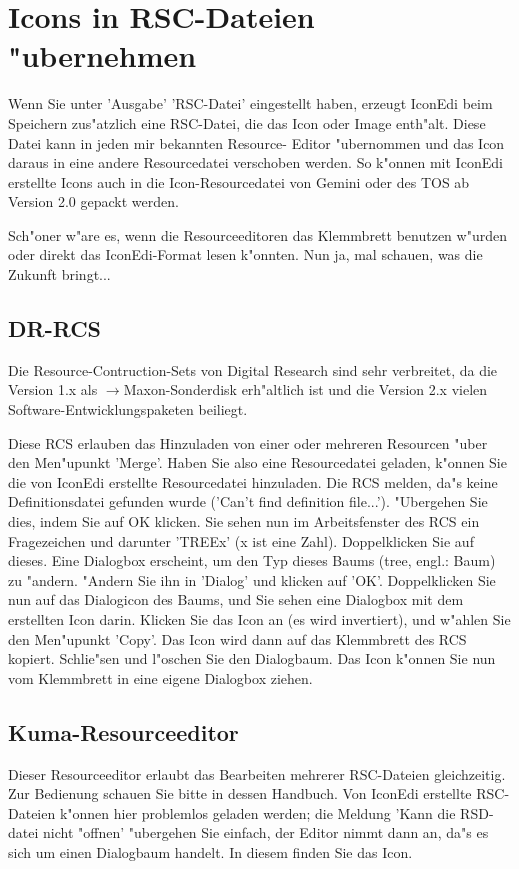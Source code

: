 \section{Icons in RSC-Dateien "ubernehmen}
Wenn Sie unter 'Ausgabe' 'RSC-Datei' eingestellt haben, erzeugt 
IconEdi beim Speichern zus"atzlich eine RSC-Datei, die das Icon oder
Image enth"alt. Diese Datei kann in jeden mir bekannten Resource-
Editor "ubernommen und das Icon daraus in eine andere Resourcedatei
verschoben werden. So k"onnen mit IconEdi erstellte Icons auch in 
die Icon-Resourcedatei von Gemini oder des TOS ab Version 2.0 
gepackt werden.

Sch"oner w"are es, wenn die Resourceeditoren das Klemmbrett benutzen
w"urden oder direkt das IconEdi-Format lesen k"onnten. Nun ja,
mal schauen, was die Zukunft bringt...


\subsection{DR-RCS} 
Die Resource-Contruction-Sets von Digital Research sind sehr 
verbreitet, da die Version 1.x als $\to$Maxon-Sonderdisk
erh"altlich ist und die Version 2.x vielen 
Software-Entwicklungspaketen beiliegt.

Diese RCS erlauben das Hinzuladen von einer oder mehreren 
Resourcen "uber den Men"upunkt 'Merge'. Haben Sie also eine
Resourcedatei geladen, k"onnen Sie die von IconEdi erstellte 
Resourcedatei hinzuladen. Die RCS melden, da"s keine 
Definitionsdatei gefunden wurde ('Can't find definition file...').
"Ubergehen Sie dies, indem Sie auf OK klicken. Sie sehen nun
im Arbeitsfenster des RCS ein Fragezeichen und darunter 'TREEx'
(x ist eine Zahl). Doppelklicken Sie auf dieses. Eine Dialogbox
erscheint, um den Typ dieses Baums (tree, engl.: Baum) zu "andern.
"Andern Sie ihn in 'Dialog' und klicken auf 'OK'. Doppelklicken
Sie nun auf das Dialogicon des Baums, und Sie sehen eine Dialogbox
mit dem erstellten Icon darin. Klicken Sie das Icon an (es wird
invertiert), und w"ahlen Sie den Men"upunkt 'Copy'. Das Icon wird dann
auf das Klemmbrett des RCS kopiert. Schlie"sen und l"oschen Sie
den Dialogbaum. Das Icon k"onnen Sie nun vom Klemmbrett in eine 
eigene Dialogbox ziehen.

\subsection{Kuma-Resourceeditor} 
Dieser Resourceeditor erlaubt das Bearbeiten mehrerer RSC-Dateien
gleichzeitig. Zur Bedienung schauen Sie bitte in dessen Handbuch.
Von IconEdi erstellte RSC-Dateien k"onnen hier problemlos geladen
werden; die Meldung 'Kann die RSD-datei nicht "offnen' "ubergehen
Sie einfach, der Editor nimmt dann an, da"s es sich um einen 
Dialogbaum handelt. In diesem finden Sie das Icon.


